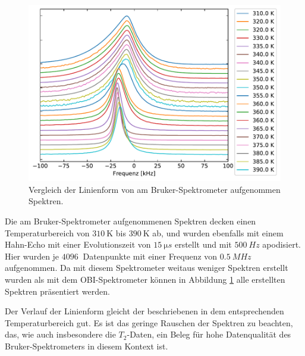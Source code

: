 \begin{figure}
	\begin{center}
		\includegraphics[width=\textwidth]{graphics/plot/bruker_lineshape.pdf}
	\end{center}
	\caption{Vergleich der Linienform von am Bruker-Spektrometer aufgenommen Spektren.} \label{fig:res:bruker_linienform}
\end{figure}
Die am Bruker-Spektrometer aufgenommenen Spektren decken einen Temperaturbereich von $\SI{310}{\kelvin}$ bis $\SI{390}{\kelvin}$ ab, und wurden ebenfalls mit einem Hahn-Echo mit einer Evolutionszeit von $\SI{15}{\micro s}$ erstellt und mit $\SI{500}{Hz}$ apodisiert. Hier wurden je $\SI{4096}{}$ Datenpunkte mit einer Frequenz von $\SI{0.5}{MHz}$ aufgenommen. Da mit diesem Spektrometer weitaus weniger Spektren erstellt wurden als mit dem OBI-Spektrometer können in Abbildung \ref{fig:res:bruker_linienform} alle erstellten Spektren präsentiert werden.

Der Verlauf der Linienform gleicht der beschriebenen in dem entsprechenden Temperaturbereich gut. Es ist das geringe Rauschen der Spektren zu beachten, das, wie auch insbesondere die $T_2$-Daten, ein Beleg für hohe Datenqualität des Bruker-Spektrometers in diesem Kontext ist.

